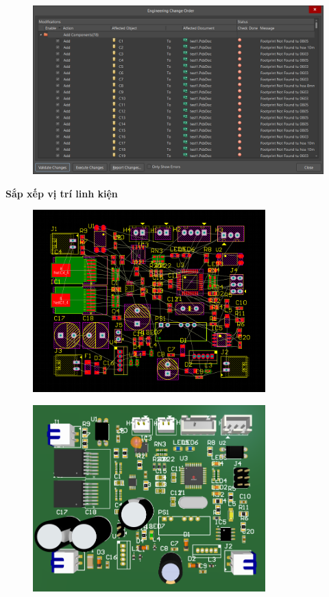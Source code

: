 \begin{figure}[H]
    \centering
    \includegraphics[width=1\textwidth]{pictures/7c.png}
\end{figure}
\cleardoublepage
\textbf{Sắp xếp vị trí linh kiện}
\begin{figure}[H]
    \centering
    \includegraphics[width=0.8\textwidth]{pictures/7d.png}
\end{figure}
\begin{figure}[H]
    \centering
    \includegraphics[width=0.8\textwidth]{pictures/7e.png}
\end{figure}

